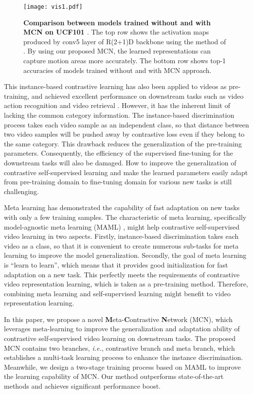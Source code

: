 \documentclass[10pt,twocolumn,letterpaper]{article}
\begin{document}
\begin{figure}[H]
\centering
\texttt{[image: vis1.pdf]}
\caption{\textbf{Comparison between models trained without and with MCN on UCF101 \cite{soomro2012ucf101}}. The top row shows the activation maps produced by conv5 layer of R(2+1)D backbone using the method of \cite{zagoruyko2016paying}. By using our proposed MCN, the learned representations can  capture motion areas more accurately. The bottom row shows top-1 accuracies of models trained without and with MCN approach.}
\label{fig:sample}
\centering
\end{figure}


 This instance-based contrastive learning has also been applied to videos as pre-training, and achieved excellent performance on downstream tasks such as video action recognition and video retrieval \cite{Han20, tao2020self, miech2020end}. However, it has the inherent limit of lacking the common category information. The instance-based discrimination process takes each video sample as an independent class, so that distance between two video samples will be pushed away by contrastive loss even if they belong to the same category. This drawback reduces the generalization of the pre-training parameters. Consequently, the efficiency of the supervised fine-tuning for the downstream tasks will also be damaged. How to improve the generalization of contrastive self-supervised learning and make the learned parameters easily adapt from pre-training domain to fine-tuning domain for various new tasks is still challenging.  

Meta learning has demonstrated the capability of fast adaptation on new tasks with only a few training samples. The characteristic of meta learning, specifically model-agnostic meta learning (MAML) \cite{finn2017model}, might help contrastive self-supervised video learning in two aspects. Firstly, instance-based discrimination takes each video as a class, so that it is convenient to create numerous sub-tasks for meta learning to improve the model generalization. Secondly, the goal of meta learning is “learn to learn”, which means that it provides good initialization for fast adaptation on a new task. This perfectly meets the requirements of contrastive video representation learning, which is taken as a pre-training method. Therefore, combining meta learning and self-supervised learning might benefit to video representation learning.

In this paper, we propose a novel \textbf{M}eta-\textbf{C}ontrastive \textbf{N}etwork (MCN), which leverages meta-learning to improve the generalization and adaptation ability of contrastive self-supervised video learning on downstream tasks. The proposed MCN contains two branches, \textit{i.e.}, contrastive branch and meta branch, which establishes a multi-task learning process to enhance the instance discrimination. Meanwhile, we design a two-stage training process based on MAML to improve the learning capability of MCN. Our method outperforms state-of-the-art methods and achieves significant performance boost. 
\end{document}
